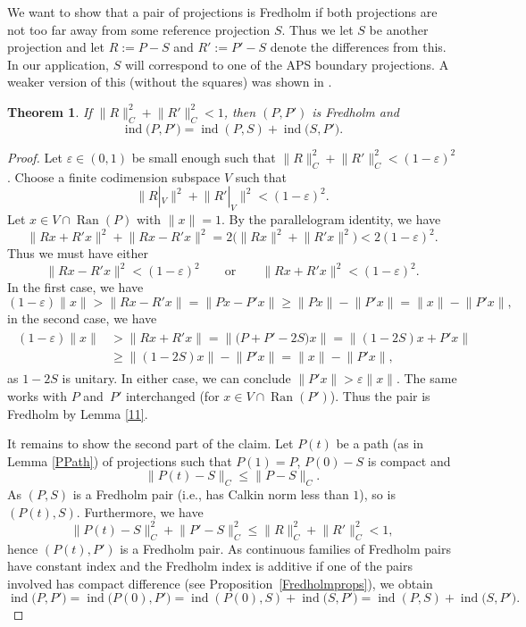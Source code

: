 \documentclass[10pt,a4paper]{amsart}
\numberwithin{equation}{section}
\newtheorem{Theorem}{Theorem}[section]
\DeclareMathOperator{\Ran}{Ran}
\DeclareMathOperator{\ind}{ind}
\begin{document}
		We want to show that a pair of projections is Fredholm if both projections are not too far away from some reference projection $S$.
	Thus we let $S$ be another projection and let $R:=P-S$ and $R':=P'-S$ denote the differences from this. In our application, $S$ will correspond to one of the APS boundary projections. A weaker version of this (without the squares) was shown in \cite[Proposition~5.3.15]{DSW}.

	\begin{Theorem}
		\label{Cnormfred}
		If $\|R\|_C^2+\bigl\|R'\bigr\|_C^2<1$,  then $(P,P')$ is Fredholm and
		\[ \ind\bigl(P,P'\bigr)=\ind(P,S)+\ind\bigl(S,P'\bigr).\]
	\end{Theorem}

	\begin{proof}
		Let $\varepsilon\in(0,1)$ be small enough such that
$\|R\|_C^2+\bigl\|R'\bigr\|_C^2<(1-\varepsilon)^2$.
		Choose a finite codimension subspace $V$ such that
		\[\|R|_V\|^2+\bigl\|R' |_V\bigr\|^2<(1-\varepsilon)^2.\]
		Let $x\in V\cap \Ran(P)$ with $\|x\|=1$. By the parallelogram identity, we have
		\[\bigl\|Rx+R'x\bigr\|^2+\bigl\|Rx-R'x\bigr\|^2=2\bigl(\|Rx\|^2+\bigl\|R'x\bigr\|^2\bigr)<2(1-\varepsilon)^2. \]
		Thus we must have either
		\[\bigl\|Rx-R'x\bigr\|^2<(1-\varepsilon)^2\qquad \text{or}\qquad
		 \bigl\|Rx+R'x\bigr\|^2<(1-\varepsilon)^2.\]
		In the first case, we have
		\[(1-\varepsilon)\|x\|>\bigl\|Rx-R'x\bigr\|=\bigl\|Px-P'x\bigr\|\geq\|Px\|-\bigl\|P'x\bigr\|=\|x\|-\bigl\|P'x\bigr\|,\]
		in the second case, we have
		\begin{align*}
\begin{split}
			(1-\varepsilon)\|x\|&>\bigl\|Rx+R'x \bigr\|
			 =\bigl\|\bigl(P+P'-2S\bigr)x\bigr\|
			 =\bigl\|(1-2S)x+P'x\bigr\|\\
			&\geq\|(1-2S)x\|-\bigl\|P'x\bigr\|
			 =\|x\|-\bigl\|P'x\bigr\|,
\end{split}
		\end{align*}
		as $1-2S$ is unitary.
		In either case, we can conclude $\|P'x\|>\varepsilon\|x\|$. The same works with $P$ and~$P'$ interchanged (for $x\in V\cap\Ran(P')$). Thus the pair is Fredholm by Lemma \ref{11}.
		
		It remains to show the second part of the claim. Let $P(t)$ be a path (as in Lemma \ref{PPath}) of projections such that $P(1)=P$, $P(0)-S$ is compact and
		\[\|P(t)-S\|_C\leq \|P-S\|_C.\]
		As $(P,S)$ is a Fredholm pair (i.e., has Calkin norm less than $1$), so is $(P(t),S)$. Furthermore, we have
		\[\|P(t)-S\|_C^2+\bigl\|P'-S\bigr\|_C^2\leq \|R\|_C^2+\bigl\|R'\bigr\|_C^2<1,\]
		hence $(P(t),P')$ is a Fredholm pair. As continuous families of Fredholm pairs have constant index and the Fredholm index is additive if one of the pairs involved has compact difference (see Proposition~\ref{Fredholmprops}), we obtain
		\[
        \ind\bigl(P,P'\bigr)=\ind\bigl(P(0),P'\bigr)=\ind(P(0),S)+\ind\bigl(S,P'\bigr)=\ind(P,S)+\ind\bigl(S,P'\bigr).
        \tag*{\qed}
        \]
\renewcommand{\qed}{}
\end{proof}
\end{document}

